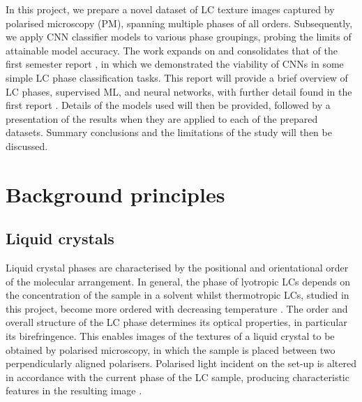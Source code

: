 \documentclass[12pt]{article}
\begin{document}
In this project, we prepare a novel dataset of LC texture images captured by polarised microscopy (PM), spanning multiple phases of all orders. Subsequently, we apply CNN classifier models to various phase groupings, probing the limits of attainable model accuracy. The work expands on and consolidates that of the first semester report \cite{Heaton20}, in which we demonstrated the viability of CNNs in some simple LC phase classification tasks. This report will provide a brief overview of LC phases, supervised ML, and neural networks, with further detail found in the first report \cite{Heaton20}. Details of the models used will then be provided, followed by a presentation of the results when they are applied to each of the prepared datasets. Summary conclusions and the limitations of the study will then be discussed.
\section{Background principles}

\subsection{Liquid crystals}
Liquid crystal phases are characterised by the positional and orientational order of the molecular arrangement. In general, the phase of lyotropic LCs depends on the concentration of the sample in a solvent whilst thermotropic LCs, studied in this project, become more ordered with decreasing temperature \cite{Dierking03}. The order and overall structure of the LC phase determines its optical properties, in particular its birefringence. This enables images of the textures of a liquid crystal to be obtained by polarised microscopy, in which the sample is placed between two perpendicularly aligned polarisers. Polarised light incident on the set-up is altered in accordance with the current phase of the LC sample, producing characteristic features in the resulting image \cite{Dierking03}.
\end{document}
